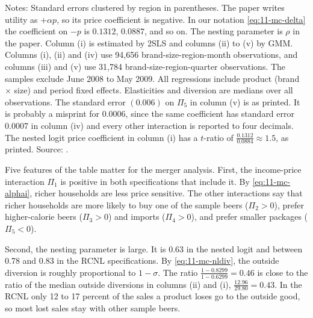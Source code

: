 \begin{table}[htbp]
\smallskip
\begin{minipage}{0.97\linewidth}
\footnotesize Notes: Standard errors clustered by region in parentheses. The paper writes utility as $+\alpha p$, so
its price coefficient is negative. In our notation \eqref{eq:11-mc-delta} the coefficient on $-p$ is $0.1312$,
$0.0887$, and so on. The nesting parameter is $\rho$ in the paper. Column (i) is estimated by 2SLS and columns (ii) to
(v) by GMM. Columns (i), (ii) and (iv) use 94,656 brand-size-region-month observations, and columns (iii) and (v)
use 31,784 brand-size-region-quarter observations. The samples exclude June 2008 to May 2009. All regressions include
product (brand $\times$ size) and period fixed effects. Elasticities and diversion are medians over all
observations. The standard error $(0.006)$ on $\Pi_5$ in column (v) is as printed. It is probably a misprint for
0.0006, since the same coefficient has standard error 0.0007 in column (iv) and every other interaction is reported
to four decimals. The nested logit price coefficient in column (i) has a $t$-ratio of
$\frac{0.1312}{0.0884} \approx 1.5$, as printed. Source: \citet[Table IV, p.~1777]{MillerWeinberg2017}.
\end{minipage}
\end{table}

Five features of the table matter for the merger analysis. First, the income-price interaction $\Pi_1$ is positive
in both specifications that include it. By \eqref{eq:11-mc-alphai}, richer households are less price sensitive. The
other interactions say that richer households are more likely to buy one of the sample beers ($\Pi_2 > 0$), prefer
higher-calorie beers ($\Pi_3 > 0$) and imports ($\Pi_4 > 0$), and prefer smaller packages ($\Pi_5 < 0$).

Second, the nesting parameter is large. It is 0.63 in the nested logit and between 0.78 and 0.83 in the RCNL
specifications. By \eqref{eq:11-mc-nldiv}, the outside diversion is roughly proportional to $1-\sigma$. The ratio
$\frac{1 - 0.8299}{1 - 0.6299} = 0.46$ is close to the ratio of the median outside diversions in columns (ii) and
(i), $\frac{12.96}{29.80} = 0.43$. In the RCNL only 12 to 17 percent of the sales a product loses go to the outside
good, so most lost sales stay with other sample beers.

